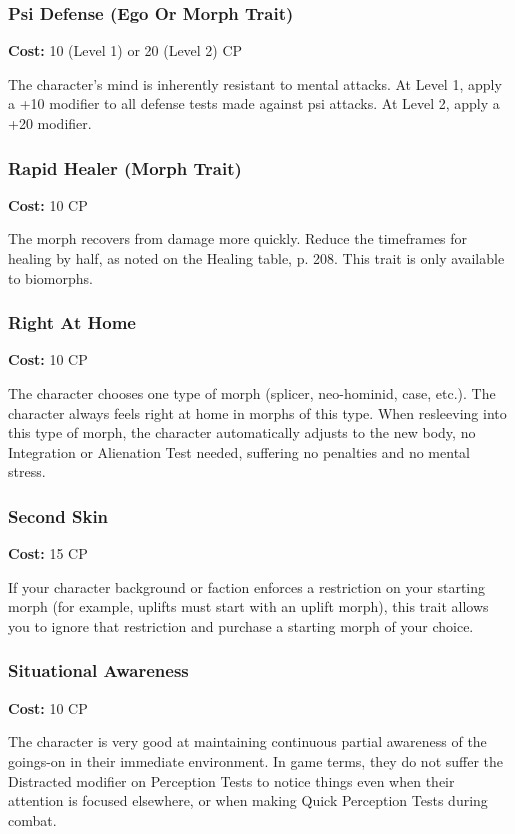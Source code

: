 \subsubsection{Psi Defense (Ego Or Morph Trait)}
\textbf{Cost:} 10 (Level 1) or 20 (Level 2) CP

The character’s mind is inherently resistant to mental attacks. At Level 1,
apply a +10 modifier to all defense tests made against psi attacks. At Level 2,
apply a +20 modifier.

\subsubsection{Rapid Healer (Morph Trait)}
\textbf{Cost:} 10 CP

The morph recovers from damage more quickly.  Reduce the timeframes for healing
by half, as noted on the Healing table, p. 208. This trait is only available
to biomorphs.

\subsubsection{Right At Home}
\textbf{Cost:} 10 CP

The character chooses one type of morph (splicer, neo-hominid, case, etc.). The
character always feels right at home in morphs of this type. When resleeving
into this type of morph, the character automatically adjusts to the new body,
no Integration or Alienation Test needed, suffering no penalties and no mental
stress.

\subsubsection{Second Skin}
\textbf{Cost:} 15 CP

If your character background or faction enforces a restriction on your starting
morph (for example, uplifts must start with an uplift morph), this trait
allows you to ignore that restriction and purchase a starting morph of your
choice.

\subsubsection{Situational Awareness}
\textbf{Cost:} 10 CP

The character is very good at maintaining continuous partial awareness of the
goings-on in their immediate environment. In game terms, they do not suffer the
Distracted modifier on Perception Tests to notice things even when their
attention is focused elsewhere, or when making Quick Perception Tests during
combat.

